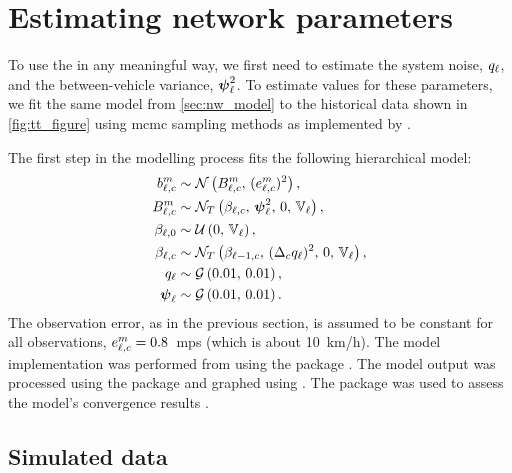 
\section{Estimating network parameters}
\label{sec:nw_par_est}


To use the \kf{} in any meaningful way, we first need to estimate the system noise, $q_\ell$, and the between-vehicle variance, $\mathbf{\boldsymbol{\psi}}_{\ell}^2$. To estimate values for these parameters, we fit the same model from \cref{sec:nw_model} to the historical data shown in \cref{fig:tt_figure} using \gls{mcmc} sampling methods as implemented by  \citep{JAGS}.


The first step in the modelling process fits the following hierarchical model:
\begin{equation}
\label{eq:nw_model_simple}
\begin{split}
b_{\ell,c}^m &\sim \mathcal{N}\left(B_{\ell,c}^m,\, (e_{\ell,c}^m)^2\right), \\
B_{\ell,c}^m &\sim \mathcal{N}_T\left(\beta_{\ell,c},\, \mathbf{\boldsymbol{\psi}}_{\ell}^2,\, 0,\, \mathbb{V}_\ell\right), \\
\beta_{\ell,0} &\sim \mathcal{U}\left(0,\, \mathbb{V}_\ell\right), \\
\beta_{\ell,c} &\sim \mathcal{N}_T\left(\beta_{\ell-1,c},\, (\Delta_c q_{\ell})^2,\, 0,\, \mathbb{V}_\ell\right), \\
q_\ell &\sim \mathcal{G}\left(0.01,\, 0.01\right), \\
\mathbf{\boldsymbol{\psi}}_\ell &\sim \mathcal{G}\left(0.01,\, 0.01\right).
\end{split}
\end{equation}
The observation error, as in the previous section, is assumed to be constant for all observations, $e_{\ell,c}^m = 0.8$~\gls{mps} (which is about 10~km/h). The model implementation was performed from \Rstats{} using the  package \citep{rjags}. The model output was processed using the  package \citep{tidybayes} and graphed using  \citep{ggplot2}. The  package was used to assess the model's convergence results \citep{coda}.


\subsection{Simulated data}
\label{nw_par_est_sim}

